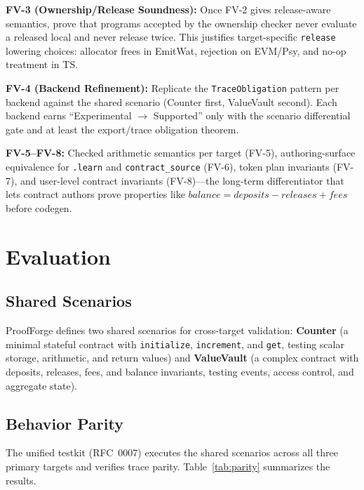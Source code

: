 \documentclass[sigconf]{acmart}
\begin{document}
\textbf{FV-3 (Ownership/Release Soundness):} Once FV-2 gives release-aware semantics, prove
that programs accepted by the ownership checker never evaluate a released local and never
release twice. This justifies target-specific \texttt{release} lowering choices: allocator
frees in EmitWat, rejection on EVM/Psy, and no-op treatment in TS.

\textbf{FV-4 (Backend Refinement):} Replicate the \texttt{TraceObligation} pattern per backend
against the shared scenario (Counter first, ValueVault second). Each backend earns
``Experimental $\to$ Supported'' only with the scenario differential gate and at least the
export/trace obligation theorem.

\textbf{FV-5--FV-8:} Checked arithmetic semantics per target (FV-5), authoring-surface
equivalence for \texttt{.learn} and \texttt{contract\_source} (FV-6), token plan invariants
(FV-7), and user-level contract invariants (FV-8)---the long-term differentiator that lets
contract authors prove properties like $\textit{balance} = \textit{deposits} - \textit{releases} + \textit{fees}$
before codegen.

\section{Evaluation}
\label{sec:eval}

\subsection{Shared Scenarios}

ProofForge defines two shared scenarios for cross-target validation:
\textbf{Counter} (a minimal stateful contract with \texttt{initialize}, \texttt{increment},
and \texttt{get}, testing scalar storage, arithmetic, and return values) and
\textbf{ValueVault} (a complex contract with deposits, releases, fees, and balance invariants,
testing events, access control, and aggregate state).

\subsection{Behavior Parity}

The unified testkit (RFC~0007) executes the shared scenarios across all three primary targets
and verifies trace parity. Table~\ref{tab:parity} summarizes the results.
\end{document}

